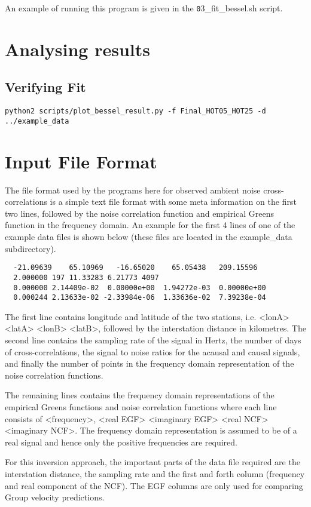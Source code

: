 \documentclass{article}
\begin{document}
An example of running this program is given in the {\texttt 03\_fit\_bessel.sh} script.

\section{Analysing results}

\subsection{Verifying Fit}

\begin{verbatim}
python2 scripts/plot_bessel_result.py -f Final_HOT05_HOT25 -d ../example_data
\end{verbatim}



\appendix
  
\section{Input File Format}

The file format used by the programs here for observed ambient noise
cross-correlations is a simple text file format with some meta
information on the first two lines, followed by the noise correlation
function and empirical Greens function in the frequency domain.  An
example for the first 4 lines of one of the example data files is
shown below (these files are located in the example\_data
subdirectory).

\begin{verbatim}
  -21.09639    65.10969   -16.65020    65.05438   209.15596
  2.000000 197 11.33283 6.21773 4097
  0.000000 2.14409e-02  0.00000e+00  1.94272e-03  0.00000e+00
  0.000244 2.13633e-02 -2.33984e-06  1.33636e-02  7.39238e-04
\end{verbatim}

The first line contains longitude and latitude of the two stations,
i.e. <lonA> <latA> <lonB> <latB>, followed by the interstation
distance in kilometres. The second line contains the sampling rate of
the signal in Hertz, the number of days of cross-correlations, the
signal to noise ratios for the acausal and causal signals, and finally
the number of points in the frequency domain representation of the
noise correlation functions.

The remaining lines contains the frequency domain representations of
the empirical Greens functions and noise correlation functions where
each line consists of <frequency>, <real EGF> <imaginary EGF> <real
NCF> <imaginary NCF>. The frequency domain representation is assumed
to be of a real signal and hence only the positive frequencies are
required.

For this inversion approach, the important parts of the data file
required are the interstation distance, the sampling rate and the
first and forth column (frequency and real component of the NCF). The
EGF columns are only used for comparing Group velocity predictions.
\end{document}

